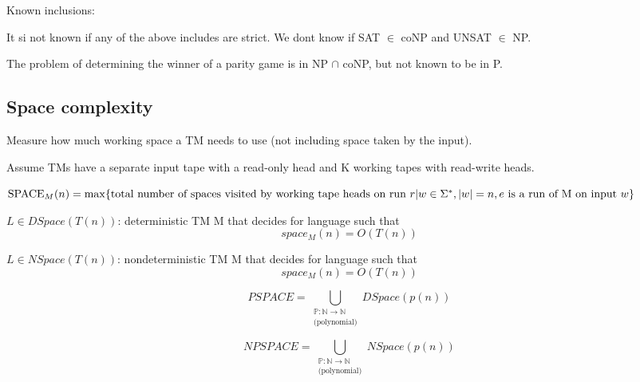 \documentclass[a4paper,12pt]{article}
\theoremstyle{definition}
\theoremstyle{remark}
\newcommand{\N}{\mathbb{N}}
\newcommand{\Pp}{\mathbb{P}}
\begin{document}
Known inclusions:


It si not known if any of the above includes are strict. We dont know if SAT $\in$ coNP and UNSAT $\in$ NP.

The problem of determining the winner of a parity game is in NP $\cap$ coNP, but not known to be in P.

\subsection{Space complexity}

Measure how much working space a TM needs to use (not including space taken by the input).

Assume TMs have a separate input tape with a read-only head and K working tapes with read-write heads.

$\text{SPACE}_M(n) = \max\{ \text{total number of spaces visited by working tape heads on run } r | \\ 
w \in \Sigma^*, |w| = n, e \text{ is a run of M on input } w\}$

$L \in DSpace(T(n))$: deterministic TM M that decides for language such that 
\begin{equation*}
    space_M (n) = O(T(n))
\end{equation*}

$L \in NSpace(T(n))$: nondeterministic TM M that decides for language such that
\begin{equation*}
    space_M (n) = O(T(n))
\end{equation*}

\begin{equation*}
    PSPACE = \bigcup_{\substack{\Pp: \N \to \N \\ \text{(polynomial)}}} DSpace(p(n))
\end{equation*}

\begin{equation*}
    NPSPACE = \bigcup_{\substack{\Pp: \N \to \N \\ \text{(polynomial)}}} NSpace(p(n))
\end{equation*}
\end{document}
